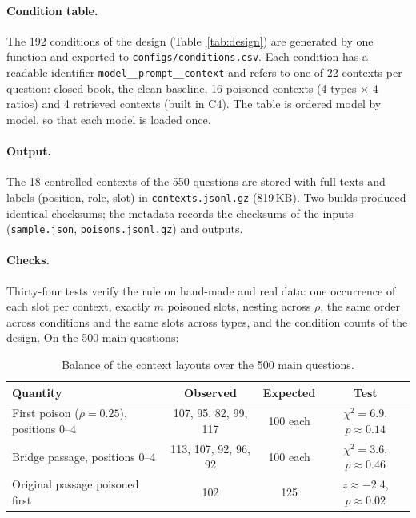 \documentclass[11pt,a4paper]{report}
\begin{document}
\paragraph{Condition table.}
The 192 conditions of the design (Table~\ref{tab:design}) are generated by one
function and exported to \texttt{configs/conditions.csv}. Each condition has a
readable identifier \texttt{model\_\_prompt\_\_context} and refers to one of
22 contexts per question: closed-book, the clean baseline, 16 poisoned contexts
(4 types $\times$ 4 ratios) and 4 retrieved contexts (built in C4). The table
is ordered model by model, so that each model is loaded once.

\paragraph{Output.}
The 18 controlled contexts of the 550 questions are stored with full texts and
labels (position, role, slot) in \texttt{contexts.jsonl.gz} (819\,KB). Two
builds produced identical checksums; the metadata records the checksums of the
inputs (\texttt{sample.json}, \texttt{poisons.jsonl.gz}) and outputs.

\paragraph{Checks.}
Thirty-four tests verify the rule on hand-made and real data: one occurrence of
each slot per context, exactly $m$ poisoned slots, nesting across $\rho$, the
same order across conditions and the same slots across types, and the
condition counts of the design. On the 500 main questions:

\begin{table}[h]
\centering\small
\begin{tabular}{@{}lccc@{}}
\toprule
Quantity & Observed & Expected & Test \\
\midrule
First poison ($\rho = 0.25$), positions 0--4 & 107, 95, 82, 99, 117 & 100 each & $\chi^2 = 6.9$, $p \approx 0.14$ \\
Bridge passage, positions 0--4 & 113, 107, 92, 96, 92 & 100 each & $\chi^2 = 3.6$, $p \approx 0.46$ \\
Original passage poisoned first & 102 & 125 & $z \approx -2.4$, $p \approx 0.02$ \\
\bottomrule
\end{tabular}
\caption{Balance of the context layouts over the 500 main questions.}
\label{tab:c1-balance}
\end{table}
\end{document}
